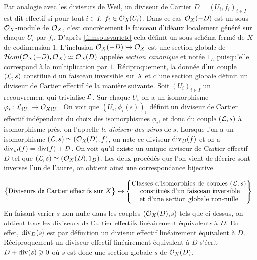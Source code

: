 Par analogie avec les diviseurs de Weil, un diviseur de Cartier $D=(U_i, f_i)_{i\in I}$ est dit effectif si pour tout $i\in I$, $f_i\in \mathcal{O}_X(U_i)$. Dans ce cas $\mathcal{O}_X(-D)$ est un sous $\mathcal{O}_X$-module de $\mathcal{O}_X$, c'est concrètement le faisceau d'idéaux localement généré sur chaque $U_i$ par $f_i$. D'après \ref{dimsousvariete} cela définit un sous-schéma fermé de $X$ de codimension 1. L'inclusion $\mathcal{O}_X(-D)\xhookrightarrow{} \mathcal{O}_X$ est une section globale de $\mathcal{H} om(\mathcal{O}_X(-D), \mathcal{O}_X)\simeq \mathcal{O}_X(D)$ appelée \textit{section canonique} et notée $1_D$ puisqu'elle correspond à la multiplication par $1$. Réciproquement, la donnée d'un couple $(\mathcal{L}, s)$ constitué d'un faisceau inversible sur $X$ et d'une section globale définit un diviseur de Cartier effectif de la manière suivante. Soit $(U_i)_{i\in I}$ un recouvrement qui trivialise $\mathcal{L}$. Sur chaque $U_i$ on a un isomorphisme $\varphi_i:\mathcal{L}_{|U_i}\rightarrow\mathcal{O}_{X|U_i}$. On voit que $(U_i,\phi_i(s))_i$ définit un diviseur de Cartier effectif indépendant du choix des isomorphismes $\phi_i$, et donc du couple $(\mathcal{L},s)$ à isomorphisme près, on l'appelle \textit{le diviseur des zéros} de $s$. Lorsque l'on a un isomorphisme $(\mathcal{L},s)\simeq (\mathcal{O}_X(D),f)$, on note ce diviseur $\operatorname{div}_D(f)$ et on a $\operatorname{div}_D(f)=\operatorname{div}(f)+D$. On voit qu'il existe un unique diviseur de Cartier effectif $D$ tel que $(\mathcal{L},s)\simeq(\mathcal{O}_X(D),1_D)$. Les deux procédés que l'on vient de décrire sont inverses l'un de l'autre, on obtient ainsi une correspondance bijective:

$$
\left\{
\begin{matrix}
\text{Diviseurs de Cartier effectifs sur }X
\end{matrix}
\right\}
\leftrightarrow
\left\{
\begin{matrix}
\text{Classes d'isomorphies de couples }(\mathcal{L}, s)\\
\text{ constitués d'un faisceau inversible}\\
\text{et d'une section globale non-nulle}
\end{matrix}
\right\}
$$
En faisant varier $s$ non-nulle dans les couples $(\mathcal{O}_X(D),s)$ tels que ci-dessus, on obtient tous les diviseurs de Cartier effectifs linéairement équivalents à $D$. En effet, $\operatorname{div}_D(s)$ est par définition un diviseur effectif linéairement équivalent à $D$. Réciproquement un diviseur effectif linéairement équivalent à $D$ s'écrit $D+\operatorname{div}(s)\geqslant 0$ où $s$ est donc une section globale $s$ de $\mathcal{O}_X(D)$.

